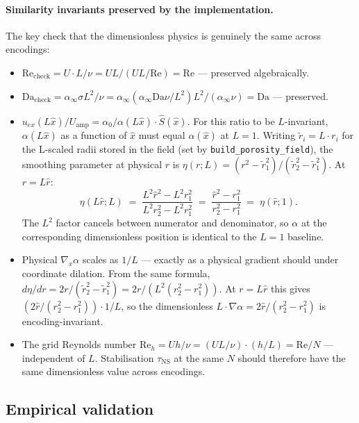 \documentclass[11pt]{article}
\newcommand{\code}[1]{\texttt{#1}}
\begin{document}
\paragraph{Similarity invariants preserved by the implementation.} The
key check that the dimensionless physics is genuinely the same across
encodings:
\begin{itemize}
\item $\mathrm{Re}_{\text{check}} = U \cdot L / \nu = U L / (UL/\mathrm{Re}) = \mathrm{Re}$
      — preserved algebraically.
\item $\mathrm{Da}_{\text{check}} = \alpha_\infty \sigma L^2 / \nu
      = \alpha_\infty (\alpha_\infty \mathrm{Da} \nu / L^2) L^2 / (\alpha_\infty \nu) = \mathrm{Da}$
      — preserved.
\item $u_{ex}(L\hat{x}) / U_{\text{amp}} = \alpha_0 / \alpha(L\hat{x}) \cdot \hat{S}(\hat{x})$.
      For this ratio to be $L$-invariant, $\alpha(L\hat{x})$ as a
      function of $\hat{x}$ must equal $\alpha(\hat{x})$ at $L=1$.
      Writing $\tilde{r}_i = L \cdot r_i$ for the L-scaled radii stored
      in the field (set by \code{build\_porosity\_field}), the
      smoothing parameter at physical $r$ is
      $\eta(r; L) = (r^2 - \tilde{r}_1^2)/(\tilde{r}_2^2 - \tilde{r}_1^2)$.
      At $r = L\hat{r}$:
      \[
        \eta(L\hat{r}; L) \;=\; \frac{L^2 \hat{r}^2 - L^2 r_1^2}{L^2 r_2^2 - L^2 r_1^2}
        \;=\; \frac{\hat{r}^2 - r_1^2}{r_2^2 - r_1^2}
        \;=\; \eta(\hat{r}; 1).
      \]
      The $L^2$ factor cancels between numerator and denominator, so
      $\alpha$ at the corresponding dimensionless position is identical
      to the $L=1$ baseline.
\item Physical $\nabla_x \alpha$ scales as $1/L$ — exactly as a physical
      gradient should under coordinate dilation. From the same formula,
      $d\eta/dr = 2r/(\tilde{r}_2^2 - \tilde{r}_1^2) = 2r/(L^2 (r_2^2 - r_1^2))$.
      At $r = L \hat{r}$ this gives $(2\hat{r}/(r_2^2 - r_1^2)) \cdot 1/L$,
      so the dimensionless $L \cdot \nabla \alpha = 2 \hat{r}/(r_2^2 - r_1^2)$
      is encoding-invariant.
\item The grid Reynolds number $\mathrm{Re}_h = U h / \nu
      = (U L / \nu) \cdot (h/L) = \mathrm{Re} / N$ — independent of $L$.
      Stabilisation $\tau_{\text{NS}}$ at the same $N$ should therefore have
      the same dimensionless value across encodings.
\end{itemize}

\subsection{Empirical validation}
\label{sec:varL-empirical}
\end{document}
